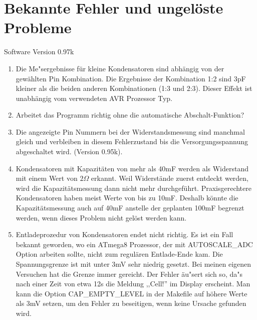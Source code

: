 
\chapter{Bekannte Fehler und ungel\"oste Probleme}
{\center Software Version 0.97k}

\begin{enumerate}
\item Die Me"sergebnisse f\"ur kleine Kondensatoren sind abh\"angig von der gew\"ahlten Pin Kombination.
Die Ergebnisse der Kombination 1:2 sind 3pF kleiner als die beiden anderen Kombinationen (1:3 und 2:3).
Dieser Effekt ist unabh\"angig vom verwendeten AVR Prozessor Typ.
\item Arbeitet das Programm richtig ohne die automatische Abschalt-Funktion?
\item Die angezeigte Pin Nummern bei der Widerstandsmessung sind manchmal gleich und verbleiben in diesem
Fehlerzustand bis die Versorgungsspannung abgeschaltet wird.
(Version 0.95k).
\item Kondensatoren mit Kapazit\"aten von mehr als 40mF werden als Widerstand mit einem Wert von \(2\Omega\) erkannt.
Weil Widerst\"ande zuerst entdeckt werden, wird die Kapazit\"atsmessung dann nicht mehr durchgef\"uhrt.
Praxisgerechtere Kondensatoren haben meist Werte von bis zu 10mF.
Deshalb k\"onnte die Kapazit\"atsmessung auch auf 40mF anstelle der geplanten 100mF begrenzt werden, wenn dieses Problem nicht
gel\"ost werden kann.
\item Entladeprozedur von Kondensatoren endet nicht richtig. Es ist ein Fall bekannt geworden, wo ein ATmega8 Prozessor,
der mit AUTOSCALE\_ADC Option arbeiten sollte, nicht zum regul\"aren Entlade-Ende kam.
Die Spannungsgrenze ist mit unter 3mV sehr niedrig gesetzt. Bei meinen eigenen Versuchen hat die Grenze immer gereicht.
Der Fehler \"au"sert sich so, da"s nach einer Zeit von etwa 12s die Meldung ,,Cell!'' im Display erscheint.
Man kann die Option CAP\_EMPTY\_LEVEL in der Makefile auf h\"ohere Werte als 3mV setzen, um den Fehler zu beseitigen,
wenn keine Ursache gefunden wird.

\end{enumerate}
